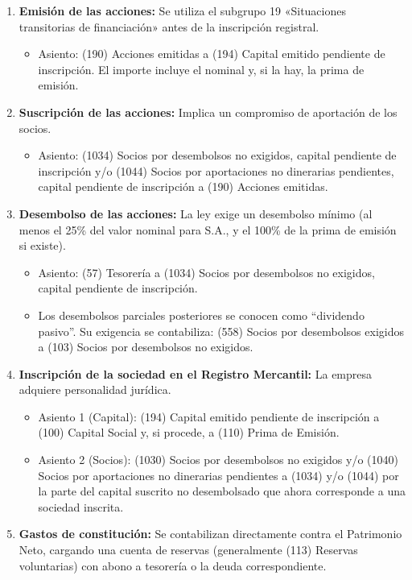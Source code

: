 \documentclass[
  paper=a4,
  ,captions=tableheading
]{scrbook}
\providecommand{\tightlist}{%
  \setlength{\itemsep}{0pt}\setlength{\parskip}{0pt}}
\begin{document}
\begin{enumerate}
\def\labelenumi{\arabic{enumi}.}
\tightlist
\item
  \textbf{Emisión de las acciones:} Se utiliza el subgrupo 19
  «Situaciones transitorias de financiación» antes de la inscripción
  registral.

  \begin{itemize}
  \tightlist
  \item
    Asiento: (190) Acciones emitidas a (194) Capital emitido pendiente
    de inscripción. El importe incluye el nominal y, si la hay, la prima
    de emisión.
  \end{itemize}
\item
  \textbf{Suscripción de las acciones:} Implica un compromiso de
  aportación de los socios.

  \begin{itemize}
  \tightlist
  \item
    Asiento: (1034) Socios por desembolsos no exigidos, capital
    pendiente de inscripción y/o (1044) Socios por aportaciones no
    dinerarias pendientes, capital pendiente de inscripción a (190)
    Acciones emitidas.
  \end{itemize}
\item
  \textbf{Desembolso de las acciones:} La ley exige un desembolso mínimo
  (al menos el 25\% del valor nominal para S.A., y el 100\% de la prima
  de emisión si existe).

  \begin{itemize}
  \tightlist
  \item
    Asiento: (57) Tesorería a (1034) Socios por desembolsos no exigidos,
    capital pendiente de inscripción.
  \item
    Los desembolsos parciales posteriores se conocen como ``dividendo
    pasivo''. Su exigencia se contabiliza: (558) Socios por desembolsos
    exigidos a (103) Socios por desembolsos no exigidos.
  \end{itemize}
\item
  \textbf{Inscripción de la sociedad en el Registro Mercantil:} La
  empresa adquiere personalidad jurídica.

  \begin{itemize}
  \tightlist
  \item
    Asiento 1 (Capital): (194) Capital emitido pendiente de inscripción
    a (100) Capital Social y, si procede, a (110) Prima de Emisión.
  \item
    Asiento 2 (Socios): (1030) Socios por desembolsos no exigidos y/o
    (1040) Socios por aportaciones no dinerarias pendientes a (1034) y/o
    (1044) por la parte del capital suscrito no desembolsado que ahora
    corresponde a una sociedad inscrita.
  \end{itemize}
\item
  \textbf{Gastos de constitución:} Se contabilizan directamente contra
  el Patrimonio Neto, cargando una cuenta de reservas (generalmente
  (113) Reservas voluntarias) con abono a tesorería o la deuda
  correspondiente.
\end{enumerate}
\end{document}
